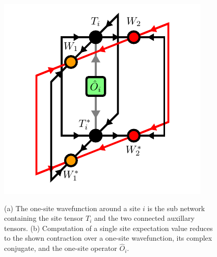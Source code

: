 \begin{figure}
	\centering
	\subcaptionbox{\label{fig:disoTPS_onesite_expectation_value_environment}}
	{%
		\usebox{\largestimage}
	}
	\quad\quad
	\subcaptionbox{\label{fig:disoTPS_onesite_expectation_value_computation}}
	{%
		\raisebox{\dimexpr.5\ht\largestimagea-.5\height}
		{%
			\includegraphics[scale=1.0]{figures/tikz/disoTPS/one_site_expectation_value/one_site_expectation_value_b.pdf}
		}
	}
	\caption{(a) The one-site wavefunction around a site $i$ is the sub network containing the site tensor $T_i$ and the two connected auxillary tensors. (b) Computation of a single site expectation value reduces to the shown contraction over a one-site wavefunction, its complex conjugate, and the one-site operator $\hat{O}_i$.}
	\label{fig:disoTPS_onesite_expectation_value}
\end{figure}
